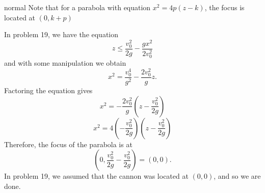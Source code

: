 \begin{solution}{normal}
Note that for a parabola with equation $x^2=4p(z-k)$, the focus is located at $(0,k+p)$\vspace{3mm}

In problem 19, we have the equation
$$z\leq\dfrac{v_0^2}{2g}-\dfrac{gx^2}{2v_0^2}$$
and with some manipulation we obtain
$$x^2=\dfrac{v_0^4}{g^2}-\dfrac{2v_0^2}{g}z.$$
Factoring the equation gives
$$x^2=-\dfrac{2v_0^2}{g}\left(z-\dfrac{v_0^2}{2g}\right)$$
$$x^2=4\left(-\dfrac{v_0^2}{2g}\right)\left(z-\dfrac{v_0^2}{2g}\right)$$
Therefore, the focus of the parabola is at
$$\left(0,\dfrac{v_0^2}{2g}-\dfrac{v_0^2}{2g}\right)=(0,0).$$
In problem 19, we assumed that the cannon was located at $(0,0)$, and so we are done.
\end{solution}